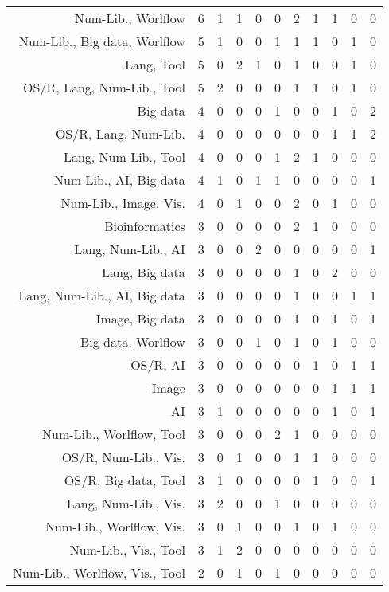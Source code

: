 {\begin{landscape}
\begin{longtable}[htb]{r|c|c|c|c|c|c|c|c|c|c}
{Num-Lib., Worlflow} & 6 & 1 & 1 & 0 & 0 & 2 & 1 & 1 & 0 & 0 \\%
{Num-Lib., Big data, Worlflow} & 5 & 1 & 0 & 0 & 1 & 1 & 1 & 0 & 1 & 0 \\%
{Lang, Tool} & 5 & 0 & 2 & 1 & 0 & 1 & 0 & 0 & 1 & 0 \\%
{OS/R, Lang, Num-Lib., Tool} & 5 & 2 & 0 & 0 & 0 & 1 & 1 & 0 & 1 & 0 \\%
{Big data} & 4 & 0 & 0 & 0 & 1 & 0 & 0 & 1 & 0 & 2 \\%
{OS/R, Lang, Num-Lib.} & 4 & 0 & 0 & 0 & 0 & 0 & 0 & 1 & 1 & 2 \\%
{Lang, Num-Lib., Tool} & 4 & 0 & 0 & 0 & 1 & 2 & 1 & 0 & 0 & 0 \\%
{Num-Lib., AI, Big data} & 4 & 1 & 0 & 1 & 1 & 0 & 0 & 0 & 0 & 1 \\%
{Num-Lib., Image, Vis.} & 4 & 0 & 1 & 0 & 0 & 2 & 0 & 1 & 0 & 0 \\%
{Bioinformatics} & 3 & 0 & 0 & 0 & 0 & 2 & 1 & 0 & 0 & 0 \\%
{Lang, Num-Lib., AI} & 3 & 0 & 0 & 2 & 0 & 0 & 0 & 0 & 0 & 1 \\%
{Lang, Big data} & 3 & 0 & 0 & 0 & 0 & 1 & 0 & 2 & 0 & 0 \\%
{Lang, Num-Lib., AI, Big data} & 3 & 0 & 0 & 0 & 0 & 1 & 0 & 0 & 1 & 1 \\%
{Image, Big data} & 3 & 0 & 0 & 0 & 0 & 1 & 0 & 1 & 0 & 1 \\%
{Big data, Worlflow} & 3 & 0 & 0 & 1 & 0 & 1 & 0 & 1 & 0 & 0 \\%
{OS/R, AI} & 3 & 0 & 0 & 0 & 0 & 0 & 1 & 0 & 1 & 1 \\%
{Image} & 3 & 0 & 0 & 0 & 0 & 0 & 0 & 1 & 1 & 1 \\%
{AI} & 3 & 1 & 0 & 0 & 0 & 0 & 0 & 1 & 0 & 1 \\%
{Num-Lib., Worlflow, Tool} & 3 & 0 & 0 & 0 & 2 & 1 & 0 & 0 & 0 & 0 \\%
{OS/R, Num-Lib., Vis.} & 3 & 0 & 1 & 0 & 0 & 1 & 1 & 0 & 0 & 0 \\%
{OS/R, Big data, Tool} & 3 & 1 & 0 & 0 & 0 & 0 & 1 & 0 & 0 & 1 \\%
{Lang, Num-Lib., Vis.} & 3 & 2 & 0 & 0 & 1 & 0 & 0 & 0 & 0 & 0 \\%
{Num-Lib., Worlflow, Vis.} & 3 & 0 & 1 & 0 & 0 & 1 & 0 & 1 & 0 & 0 \\%
{Num-Lib., Vis., Tool} & 3 & 1 & 2 & 0 & 0 & 0 & 0 & 0 & 0 & 0 \\%
{Num-Lib., Worlflow, Vis., Tool} & 2 & 0 & 1 & 0 & 1 & 0 & 0 & 0 & 0 & 0 \\%

\end{longtable}
\end{landscape}}

